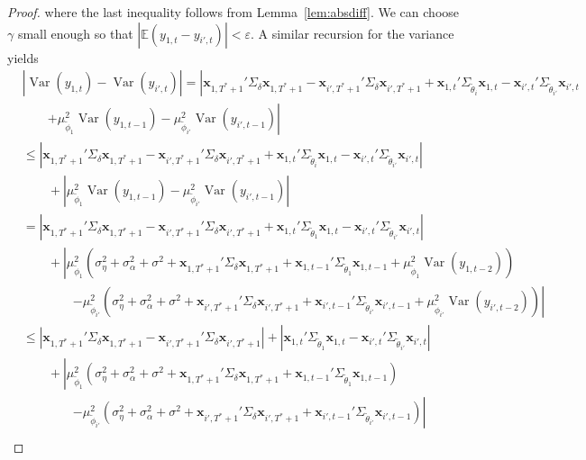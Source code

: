 \documentclass[11pt]{article}
\newcommand{\x}{\textbf{x}}
\def\E{\mathbb{E}} %
\DeclareMathOperator{\Var}{Var} %
\theoremstyle{definition}
\begin{document}
\begin{proof}
where the last inequality follows from Lemma~\ref{lem:absdiff}. We can choose $\gamma$ small enough so that $|\E(y_{1,t} - y_{i',t})| < \varepsilon$. A similar recursion for the variance yields 
\begin{align*}
 &\left\vert \Var(y_{1,t}) - \Var(y_{i',t})\right\vert 
   = \left\vert \x_{1,T^*+1}'\Sigma_\delta\x_{1,T^*+1} - \x_{i',T^*+1}'\Sigma_\delta\x_{i',T^*+1} + \x_{1,t}'\Sigma_{\tilde\theta_i}\x_{1,t} -   \x_{i',t}'\Sigma_{\tilde\theta_{i'}}\x_{i',t} \right. \\
   &\qquad\left. + \mu_{\tilde\phi_1}^2\Var(y_{1,t-1}) - \mu_{\tilde\phi_{i'}}^2\Var(y_{i',t-1}) \right\vert \\
   &\leq \left\vert \x_{1,T^*+1}'\Sigma_\delta\x_{1,T^*+1} - \x_{i',T^*+1}'\Sigma_\delta\x_{i',T^*+1} + \x_{1,t}'\Sigma_{\tilde\theta_i}\x_{1,t} -   \x_{i',t}'\Sigma_{\tilde\theta_{i'}}\x_{i',t}\right\vert \\
   &\qquad + \left\vert\mu_{\tilde\phi_1}^2\Var(y_{1,t-1}) - \mu_{\tilde\phi_{i'}}^2\Var(y_{i',t-1})\right\vert \\
   &= \left\vert \x_{1,T^*+1}'\Sigma_\delta\x_{1,T^*+1} - \x_{i',T^*+1}'\Sigma_\delta\x_{i',T^*+1} + \x_{1,t}'\Sigma_{\tilde\theta_1}\x_{1,t} -   \x_{i',t}'\Sigma_{\tilde\theta_{i'}}\x_{i',t}\right\vert \\
   &\qquad + \left\vert \mu_{\tilde\phi_1}^2\left(\sigma^2_\eta + \sigma^2_{\alpha}+ \sigma^2 + \x_{1,T^*+1}'\Sigma_\delta\x_{1,T^*+1} + \x_{1,t-1}'\Sigma_{\tilde\theta_1}\x_{1,t-1} + \mu_{\tilde\phi_1}^2\Var(y_{1,t-2})\right) \right.\\
   &\qquad\qquad\left.- \mu_{\tilde\phi_{i'}}^2\left(\sigma^2_\eta + \sigma^2_{\alpha}+ \sigma^2 + \x_{i',T^*+1}'\Sigma_\delta\x_{i',T^*+1} + \x_{i',t-1}'\Sigma_{\tilde\theta_{i'}}\x_{i',t-1} + \mu_{\tilde\phi_{i'}}^2\Var(y_{i',t-2})\right) \right\vert \\
   &\leq \left\vert \x_{1,T^*+1}'\Sigma_\delta\x_{1,T^*+1} - \x_{i',T^*+1}'\Sigma_\delta\x_{i',T^*+1}\right\vert + \left\vert\x_{1,t}'\Sigma_{\tilde\theta_1}\x_{1,t} -   \x_{i',t}'\Sigma_{\tilde\theta_{i'}}\x_{i',t}\right\vert \\ 
   &\qquad+ \left\vert \mu_{\tilde\phi_1}^2\left(\sigma^2_\eta + \sigma^2_{\alpha}+ \sigma^2 + \x_{1,T^*+1}'\Sigma_\delta\x_{1,T^*+1} + \x_{1,t-1}'\Sigma_{\tilde\theta_1}\x_{1,t-1}\right) \right.\\
   &\qquad\qquad\left.- \mu_{\tilde\phi_{i'}}^2\left(\sigma^2_\eta + \sigma^2_{\alpha}+ \sigma^2 + \x_{i',T^*+1}'\Sigma_\delta\x_{i',T^*+1} + \x_{i',t-1}'\Sigma_{\tilde\theta_{i'}}\x_{i',t-1}\right) \right\vert \\

\end{align*}
\end{proof}
\end{document}
